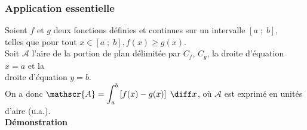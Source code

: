 \subsubsection{Application essentielle}

Soient $f$ et $g$ deux fonctions définies et continues sur un intervalle $\left[a \; ; \; b\right]$, \\ telles que pour tout $x \in \left[a \; ; \; b\right], f(x) \geqslant g(x)$. \\
Soit $\mathscr{A}$ l'aire de la portion de plan délimitée par $C_f$, $C_g$, la droite d'équation $x = a$ et la \\ droite d'équation $y = b$. \\

On a donc $\mathscr{A} = \displaystyle{\int_a^b \left[f(x) - g(x)\right] \; \diff x}$, où $\mathscr{A}$ est exprimé en unités d'aire (u.a.). \\

\textbf{Démonstration} \\

